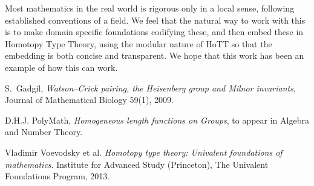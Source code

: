 \documentclass{amsart}
\theoremstyle{plain}
\theoremstyle{definition}
\theoremstyle{remark}
\begin{document}
Most mathematics in the real world is rigorous only in a local sense, following established conventions of a field. We feel that the natural way to work with this is to make domain specific foundations codifying these, and then embed these in Homotopy Type Theory, using the modular nature of HoTT so that the embedding is both concise and transparent. We hope that this work has been an example of how this can work.

\begin{thebibliography}{10}


S.~Gadgil, {\em Watson--Crick pairing, the Heisenberg group and Milnor
  invariants}, Journal
  of Mathematical Biology 59(1), 2009.

D.H.J. PolyMath, \emph{Homogeneous length functions on Groups}, to appear in Algebra and Number Theory.

Vladimir Voevodsky et al. \emph{Homotopy type theory: Univalent foundations
of mathematics}. Institute for Advanced Study (Princeton), The Univalent
Foundations Program, 2013.

\end{thebibliography}
\end{document}
